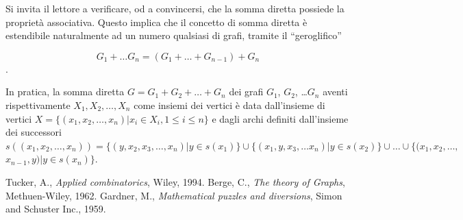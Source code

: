 \documentclass[a4paper, 10pt]{report}
\theoremstyle{definition} %
\begin{document}
Si invita il lettore a verificare, od a convincersi, che la somma diretta
possiede la propriet\`a associativa. Questo implica che il concetto di somma
diretta \`e estendibile naturalmente ad un numero qualsiasi di grafi, tramite
il ``geroglifico'' 

\[ G_1 + \ldots G_n = (G_1 + \ldots + G_{n-1}) + G_n \].

In pratica, la somma diretta $G = G_1 + G_2 + \ldots + G_n$ dei grafi $G_1$,
$G_2$, \ldots $G_n$ aventi rispettivamente $X_1, X_2, \ldots , X_n$ come
insiemi dei vertici \`e data dall'insieme di vertici $X=\{(x_1, x_2, \ldots,
x_n) \vert x_i \in X_i, 1 \le i \le n\}$ e dagli archi definiti dall'insieme
dei successori $s((x_1, x_2, \ldots, x_n)) = \{(y, x_2, x_3, \ldots, x_n)
\vert y \in s(x_1)\} \cup \{(x_1, y, x_3, \ldots x_n) \vert y \in s(x_2)\} \cup
\ldots \cup \{(x_1, x_2, \ldots,$ \- $x_{n-1}, y) \vert y \in s(x_n)\}$.




\newpage
\begin{thebibliography}{3}
 Tucker, A., \textsl{Applied combinatorics}, Wiley, 1994. 
 Berge, C., \textsl{The theory of Graphs}, Methuen-Wiley, 1962.
 Gardner, M., \textsl{Mathematical puzzles and diversions},
  Simon and Schuster Inc., 1959. 
\end{thebibliography}
\end{document}
